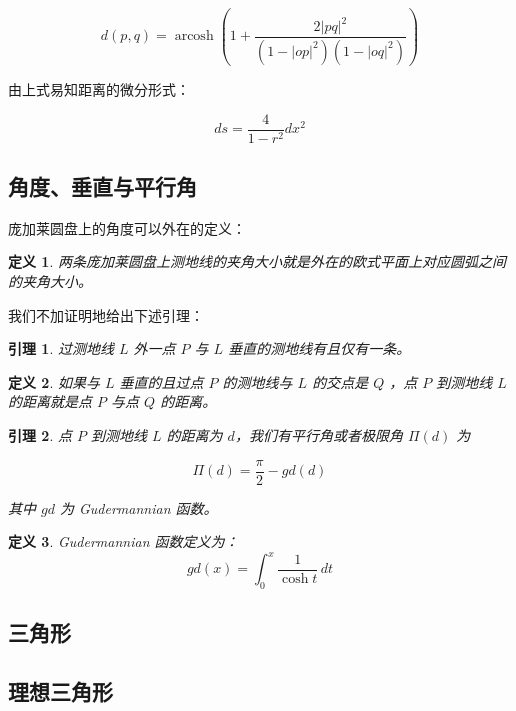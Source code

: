 \documentclass[a4paper,12pt]{article}
\newtheorem{definition}{定义}
\newtheorem{lemma}{引理}
\begin{document}
$$d(p,q) = \operatorname{arcosh} \left( 1 + \frac{2 |pq|^2}{(1-|op|^2)(1-|oq|^2)} \right) $$

由上式易知距离的微分形式：

$$ ds = \frac{4}{1 - r^2} dx^2 $$

\newpage

\subsection{角度、垂直与平行角}

庞加莱圆盘上的角度可以外在的定义：

\begin{definition}
\label{d3}
两条庞加莱圆盘上测地线的夹角大小就是外在的欧式平面上对应圆弧之间的夹角大小。
\end{definition}

我们不加证明地给出下述引理：

\begin{lemma}
\label{l2}
过测地线 $L$ 外一点 $P$ 与 $L$ 垂直的测地线有且仅有一条。
\end{lemma}

\begin{definition}
\label{d4}
如果与 $L$ 垂直的且过点 $P$ 的测地线与 $L$ 的交点是 $Q$ ，点 $P$ 到测地线 $L$ 的距离就是点 $P$ 与点 $Q$ 的距离。
\end{definition}

\begin{lemma}
\label{l3}
点 $P$ 到测地线 $L$ 的距离为 $d$，我们有平行角或者极限角 $ \Pi(d) $ 为

$$ \Pi(d) =  \frac{\pi}{2} - gd(d) $$

其中 $gd$ 为 Gudermannian 函数。
\end{lemma}

\begin{definition}
\label{d5}
Gudermannian 函数定义为：
$$ gd(x)=\int_0^x\frac{1}{\cosh t} \, dt $$
\end{definition}


\newpage

\subsection{三角形}

\newpage

\subsection{理想三角形}
\end{document}
